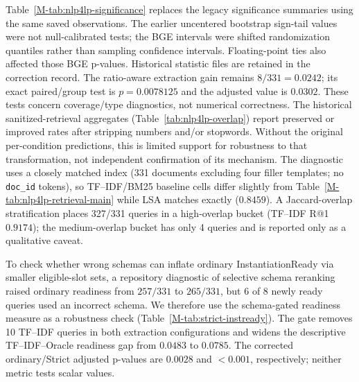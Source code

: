 Table~\ref{M-tab:nlp4lp-significance} replaces the legacy significance summaries using the same saved observations. The earlier uncentered bootstrap sign-tail values were not null-calibrated tests; the BGE intervals were shifted randomization quantiles rather than sampling confidence intervals. Floating-point ties also affected those BGE p-values. Historical statistic files are retained in the correction record. The ratio-aware extraction gain remains $8/331=0.0242$; its exact paired/group test is $p=0.0078125$ and the adjusted value is $0.0302$. These tests concern coverage/type diagnostics, not numerical correctness.
The historical sanitized-retrieval aggregates (Table~\ref{tab:nlp4lp-overlap}) report preserved or improved rates after stripping numbers and/or stopwords. Without the original per-condition predictions, this is limited support for robustness to that transformation, not independent confirmation of its mechanism. The diagnostic uses a closely matched index (331 documents excluding four filler templates; no \texttt{doc\_id} tokens), so TF--IDF/BM25 baseline cells differ slightly from Table~\ref{M-tab:nlp4lp-retrieval-main} while LSA matches exactly ($0.8459$). A Jaccard-overlap stratification places 327/331 queries in a high-overlap bucket (TF--IDF R@1 $0.9174$); the medium-overlap bucket has only 4 queries and is reported only as a qualitative caveat.

To check whether wrong schemas can inflate ordinary InstantiationReady via smaller eligible-slot sets, a repository diagnostic of selective schema reranking raised ordinary readiness from $257/331$ to $265/331$, but $6$ of $8$ newly ready queries used an incorrect schema. We therefore use the schema-gated readiness measure as a robustness check (Table~\ref{M-tab:strict-instready}). The gate removes 10 TF--IDF queries in both extraction configurations and widens the descriptive TF--IDF--Oracle readiness gap from $0.0483$ to $0.0785$. The corrected ordinary/Strict adjusted p-values are $0.0028$ and $<0.001$, respectively; neither metric tests scalar values.
